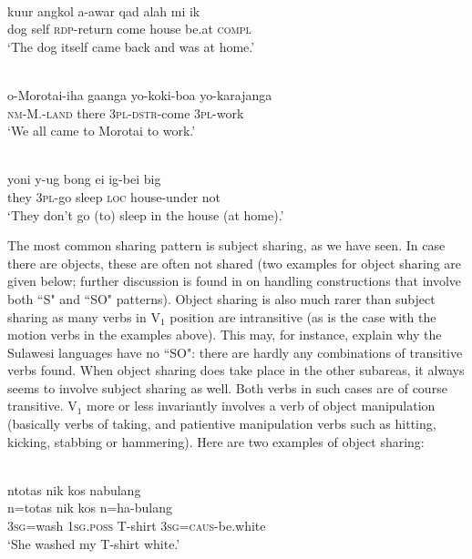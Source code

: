 \ea 
{}\\
\gll kuur angkol a-awar qad alah mi ik \\
dog self \textsc{rdp}-return come house be.at \textsc{compl} \\
\glft `The dog itself came back and was at home.'\\ 
\z

\ea \label{tobelo001}
\\
\gll o-Morotai-iha gaanga yo-koki-boa yo-karajanga \\
\textsc{nm}-M.-\textsc{land} there 3\textsc{pl}-\textsc{dstr}-come 3\textsc{pl}-work \\
\glft `We all came to Morotai to work.'\\
\z

\ea 
{}\\
\gll yoni y-ug bong ei ig-bei big \\
they 3\textsc{pl}-go sleep \textsc{loc} house-under not \\
\glft `They don't go (to) sleep in the house (at home).'\\ 
\z

The most common sharing pattern is subject sharing, as we have seen. In case there are objects, these are often not shared (two examples for object sharing are given below; further discussion is found in  on handling constructions that involve both ``S" and ``SO" patterns). Object sharing is also much rarer than subject sharing as many verbs in V$_1$ position are intransitive (as is the case with the motion verbs in the examples above). This may, for instance, explain why the Sulawesi languages have no ``SO": there are hardly any combinations of transitive verbs found. When object sharing does take place in the other subareas, it always seems to involve subject sharing as well. Both verbs in such cases are of course transitive. V$_1$ more or less invariantly involves a verb of object manipulation (basically verbs of taking, and patientive manipulation verbs such as hitting, kicking, stabbing or hammering). Here are two examples of object sharing:

\ea \label{taba001}
\\
\glll ntotas nik kos nabulang \\
n=totas nik kos n=ha-bulang \\
3\textsc{sg}=wash 1\textsc{sg}.\textsc{poss} T-shirt 3\textsc{sg}=\textsc{caus}-be.white \\
\glft `She washed my T-shirt white.'\\ 
\z

